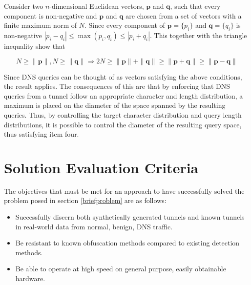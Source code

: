 \documentclass[12pt]{report}
\theoremstyle{remark}
\theoremstyle{definition}
\theoremstyle{definition}
\theoremstyle{definition}
\begin{document}

Consider two $n$-dimensional Euclidean vectors, $\mathbf p$ and $\mathbf q$,
such that every component is non-negative and $\mathbf p$ and $\mathbf q$ are
chosen from a set of vectors with a finite maximum norm of $N$. Since every
component of $\mathbf p=\{p_i\}$ and $\mathbf q=\{q_i\}$ is non-negative
$|p_i-q_i|\leq\max{(p_i,q_i)}\leq|p_i+q_i|$. This together with the triangle
inequality show that

\[N\geq\|\mathbf p\|,N\geq\|\mathbf q\|\Rightarrow 2N\geq\|\mathbf p\|+\|\mathbf q\|\geq\|\mathbf p+\mathbf q\|\geq\|\mathbf p-\mathbf q\|\]

Since DNS queries can be thought of as vectors satisfying the above conditions,
the result applies. The consequences of this are that by enforcing that DNS
queries from a tunnel follow an appropriate character and length distribution, a maximum is
placed on the diameter of the space spanned by the resulting queries. Thus, by
controlling the target character distribution and query length distributions, it
is possible to control the diameter of the resulting query space, thus
satisfying item four.

\section{Solution Evaluation Criteria} The objectives that must be met for an
approach to have successfully solved the problem posed in section
\ref{briefproblem} are as follows:

\begin{itemize} \item Successfully discern both synthetically generated tunnels
and known tunnels in real-world data from normal, benign, DNS traffic. \item Be
resistant to known obfuscation methods compared to existing detection methods.
\item Be able to operate at high speed on general purpose, easily obtainable
hardware.
\end{itemize}
\end{document}
